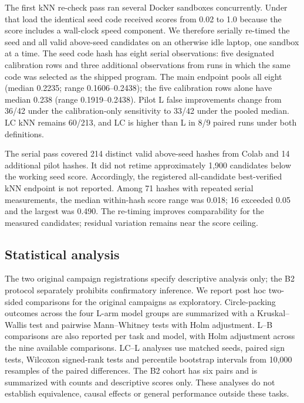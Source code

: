 \documentclass[11pt]{article}
\begin{document}
The first kNN re-check pass ran several Docker sandboxes concurrently. Under that load the identical seed code received scores from 0.02 to 1.0 because the score includes a wall-clock speed component. We therefore serially re-timed the seed and all valid above-seed candidates on an otherwise idle laptop, one sandbox at a time. The seed code hash has eight serial observations: five designated calibration rows and three additional observations from runs in which the same code was selected as the shipped program. The main endpoint pools all eight (median 0.2235; range 0.1606--0.2438); the five calibration rows alone have median 0.238 (range 0.1919--0.2438). Pilot L false improvements change from 36/42 under the calibration-only sensitivity to 33/42 under the pooled median. LC kNN remains 60/213, and LC is higher than L in 8/9 paired runs under both definitions.

The serial pass covered 214 distinct valid above-seed hashes from Colab and 14 additional pilot hashes. It did not retime approximately 1,900 candidates below the working seed score. Accordingly, the registered all-candidate best-verified kNN endpoint is not reported. Among 71 hashes with repeated serial measurements, the median within-hash score range was 0.018; 16 exceeded 0.05 and the largest was 0.490. The re-timing improves comparability for the measured candidates; residual variation remains near the score ceiling.

\subsection{Statistical analysis}

The two original campaign registrations specify descriptive analysis only; the B2 protocol separately prohibits confirmatory inference. We report post hoc two-sided comparisons for the original campaigns as exploratory. Circle-packing outcomes across the four L-arm model groups are summarized with a Kruskal--Wallis test and pairwise Mann--Whitney tests with Holm adjustment. L--B comparisons are also reported per task and model, with Holm adjustment across the nine available comparisons. LC--L analyses use matched seeds, paired sign tests, Wilcoxon signed-rank tests and percentile bootstrap intervals from 10,000 resamples of the paired differences. The B2 cohort has six pairs and is summarized with counts and descriptive scores only. These analyses do not establish equivalence, causal effects or general performance outside these tasks.
\end{document}
